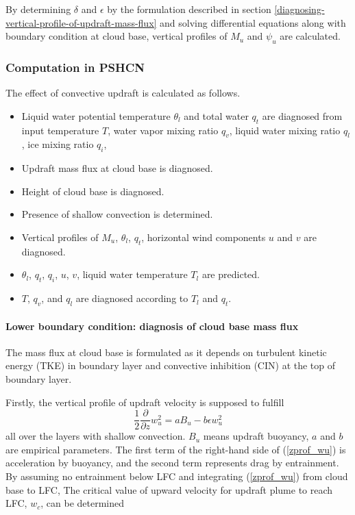 By determining $\delta$ and $\epsilon$ by the formulation described in section \ref{diagnosing-vertical-profile-of-updraft-mass-flux} 
and solving differential equations along with boundary condition at cloud base, vertical profiles of $M_u$ and $\psi_u$ are calculated.

\subsubsection{Computation in PSHCN}\label{computation-in-PSHCN}

The effect of convective updraft is calculated as follows.
\begin{itemize}
    \item Liquid water potential temperature $\theta_l$ and total water $q_t$ are diagnosed from input temperature $T$, water vapor mixing ratio $q_v$, liquid water mixing ratio $q_l$, ice mixing ratio $q_i$,
    \item Updraft mass flux at cloud base is diagnosed.
    \item Height of cloud base is diagnosed.
    \item Presence of shallow convection is determined.
    \item Vertical profiles of $M_u$, $\theta_l$, $q_t$, horizontal wind components $u$ and $v$ are diagnosed.
    \item $\theta_l$, $q_t$, $q_i$, $u$, $v$, liquid water temperature $T_l$ are predicted.
    \item $T$, $q_v$, and $q_l$ are diagnosed according to $T_l$ and $q_t$.
\end{itemize}

\paragraph{Lower boundary condition: diagnosis of cloud base mass flux}\label{lower-boundary-condition}

The mass flux at cloud base is formulated as it depends on turbulent kinetic energy (TKE) in boundary layer and convective inhibition (CIN) at the top of boundary layer.

Firstly, the vertical profile of updraft velocity is supposed to fulfill
\begin{equation}\label{zprof_wu}
    \frac{1}{2}\frac{\partial}{\partial z}w_u^2=aB_u-b\epsilon w_u^2
\end{equation}
all over the layers with shallow convection. $B_u$ means updraft buoyancy, $a$ and $b$ are empirical parameters.
The first term of the right-hand side of (\ref{zprof_wu}) is acceleration by buoyancy, and the second term represents drag by entrainment.
By assuming no entrainment below LFC and integrating (\ref{zprof_wu}) from cloud base to LFC, The critical value of upward velocity for updraft plume to reach LFC, $w_c$, can be determined

